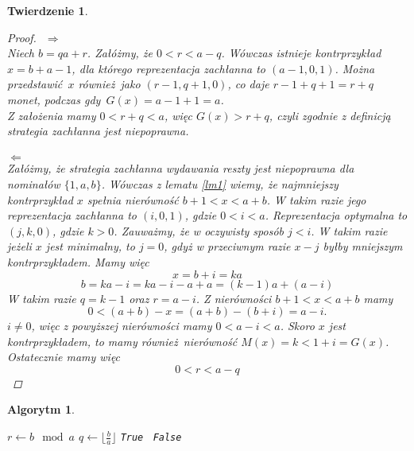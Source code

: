 \documentclass[12pt]{article}
\newtheorem*{theorem*}{Twierdzenie}
\newtheorem*{algorithm*}{Algorytm}
\begin{document}
\begin{titlepage}
\begin{theorem*}
\begin{proof}$ $\newline
$\Rightarrow$\\
Niech $b = qa + r$. Załóżmy, że $0 < r < a - q$. Wówczas istnieje
kontrprzykład $x = b + a - 1$, dla którego reprezentacja zachłanna to $(a - 1, 0, 1)$.
Można przedstawić $x$ również jako $(r - 1, q + 1, 0)$, co daje $r-1+q+1=r+q$ monet,
podczas gdy $G(x) = a - 1 + 1 = a$.\\
Z założenia mamy $0 < r + q < a$, więc $G(x) > r+q$, czyli zgodnie z definicją
strategia zachłanna jest niepoprawna.\\\\
$\Leftarrow$\\
Załóżmy, że strategia zachłanna wydawania reszty jest niepoprawna dla nominałów
$\{1, a, b\}$. Wówczas z lematu \ref{lm1} wiemy, że najmniejszy
kontrprzykład $x$ spełnia nierówność $b + 1 < x < a + b$. W takim razie jego 
reprezentacja zachłanna to $(i, 0, 1)$, gdzie $0 < i < a$. Reprezentacja optymalna
to $(j, k, 0)$, gdzie $k > 0$. Zauważmy, że w oczywisty sposób $j < i$. 
W takim razie jeżeli $x$ jest minimalny, to $j = 0$, gdyż w przeciwnym 
razie $x - j$ byłby mniejszym kontrprzykładem.
Mamy więc
$$x = b + i = ka$$
$$b = ka - i = ka - i - a + a = (k-1)a + (a-i)$$
W takim razie $q = k - 1$ oraz $r = a - i$.
Z nierówności $b + 1 < x < a + b$ mamy
$$0 < (a + b) - x = (a + b) - (b + i) = a - i.$$
$i \neq 0$, więc z powyższej nierówności mamy $0< a - i < a$.
Skoro $x$ jest kontrprzykładem, to mamy również nierówność 
$M(x) = k < 1 + i = G(x)$.\\

Ostatecznie mamy więc
$$0 < r < a - q$$
\end{proof}

\end{theorem*}

\begin{algorithm*}$ $\\
\begin{algorithmic}
    \State $r \gets b \mod a$
    \State $q \gets \lfloor \frac{b}{a} \rfloor$
        \Return \texttt{True}
    \Else $\,$
        \Return \texttt{False}
    \EndIf
\end{algorithmic}
\end{algorithm*}

\end{titlepage}
\end{document}
